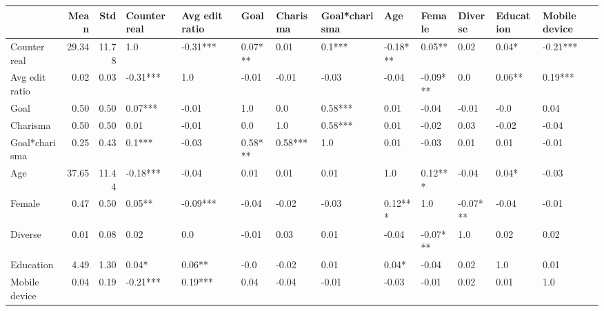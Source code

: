 \begin{tabular}{lrrllllllllll}
\toprule
{} &  Mean &   Std & Counter real & Avg edit ratio &     Goal & Charisma & Goal*charisma &       Age &    Female &   Diverse & Education & Mobile device \\
\midrule
Counter real   & 29.34 & 11.78 &          1.0 &       -0.31*** &  0.07*** &     0.01 &        0.1*** &  -0.18*** &    0.05** &      0.02 &     0.04* &      -0.21*** \\
Avg edit ratio &  0.02 &  0.03 &     -0.31*** &            1.0 &    -0.01 &    -0.01 &         -0.03 &     -0.04 &  -0.09*** &       0.0 &    0.06** &       0.19*** \\
Goal           &  0.50 &  0.50 &      0.07*** &          -0.01 &      1.0 &      0.0 &       0.58*** &      0.01 &     -0.04 &     -0.01 &      -0.0 &          0.04 \\
Charisma       &  0.50 &  0.50 &         0.01 &          -0.01 &      0.0 &      1.0 &       0.58*** &      0.01 &     -0.02 &      0.03 &     -0.02 &         -0.04 \\
Goal*charisma  &  0.25 &  0.43 &       0.1*** &          -0.03 &  0.58*** &  0.58*** &           1.0 &      0.01 &     -0.03 &      0.01 &      0.01 &         -0.01 \\
Age            & 37.65 & 11.44 &     -0.18*** &          -0.04 &     0.01 &     0.01 &          0.01 &       1.0 &   0.12*** &     -0.04 &     0.04* &         -0.03 \\
Female         &  0.47 &  0.50 &       0.05** &       -0.09*** &    -0.04 &    -0.02 &         -0.03 &   0.12*** &       1.0 &  -0.07*** &     -0.04 &         -0.01 \\
Diverse        &  0.01 &  0.08 &         0.02 &            0.0 &    -0.01 &     0.03 &          0.01 &     -0.04 &  -0.07*** &       1.0 &      0.02 &          0.02 \\
Education      &  4.49 &  1.30 &        0.04* &         0.06** &     -0.0 &    -0.02 &          0.01 &     0.04* &     -0.04 &      0.02 &       1.0 &          0.01 \\
Mobile device  &  0.04 &  0.19 &     -0.21*** &        0.19*** &     0.04 &    -0.04 &         -0.01 &     -0.03 &     -0.01 &      0.02 &      0.01 &           1.0 \\
\bottomrule
\end{tabular}
